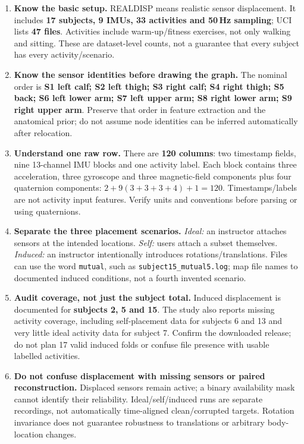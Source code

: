 \documentclass[10pt]{article}
\begin{document}
\begin{enumerate}[label=\textbf{\arabic*.},itemsep=4pt]
\item \textbf{Know the basic setup.} REALDISP means realistic sensor displacement. It includes \textbf{17 subjects, 9 IMUs, 33 activities and 50\,Hz sampling}; UCI lists \textbf{47 files}. Activities include warm-up/fitness exercises, not only walking and sitting. These are dataset-level counts, not a guarantee that every subject has every activity/scenario.

\item \textbf{Know the sensor identities before drawing the graph.} The nominal order is \textbf{S1 left calf; S2 left thigh; S3 right calf; S4 right thigh; S5 back; S6 left lower arm; S7 left upper arm; S8 right lower arm; S9 right upper arm}. Preserve that order in feature extraction and the anatomical prior; do not assume node identities can be inferred automatically after relocation.

\item \textbf{Understand one raw row.} There are \textbf{120 columns}: two timestamp fields, nine 13-channel IMU blocks and one activity label. Each block contains three acceleration, three gyroscope and three magnetic-field components plus four quaternion components: $2+9(3+3+3+4)+1=120$. Timestamps/labels are not activity input features. Verify units and conventions before parsing or using quaternions.

\item \textbf{Separate the three placement scenarios.} \emph{Ideal:} an instructor attaches sensors at the intended locations. \emph{Self:} users attach a subset themselves. \emph{Induced:} an instructor intentionally introduces rotations/translations. Files can use the word \texttt{mutual}, such as \texttt{subject15\_mutual5.log}; map file names to documented induced conditions, not a fourth invented scenario.

\item \textbf{Audit coverage, not just the subject total.} Induced displacement is documented for \textbf{subjects 2, 5 and 15}. The study also reports missing activity coverage, including self-placement data for subjects 6 and 13 and very little ideal activity data for subject 7. Confirm the downloaded release; do not plan 17 valid induced folds or confuse file presence with usable labelled activities.

\item \textbf{Do not confuse displacement with missing sensors or paired reconstruction.} Displaced sensors remain active; a binary availability mask cannot identify their reliability. Ideal/self/induced runs are separate recordings, not automatically time-aligned clean/corrupted targets. Rotation invariance does not guarantee robustness to translations or arbitrary body-location changes.


\end{enumerate}
\end{document}
